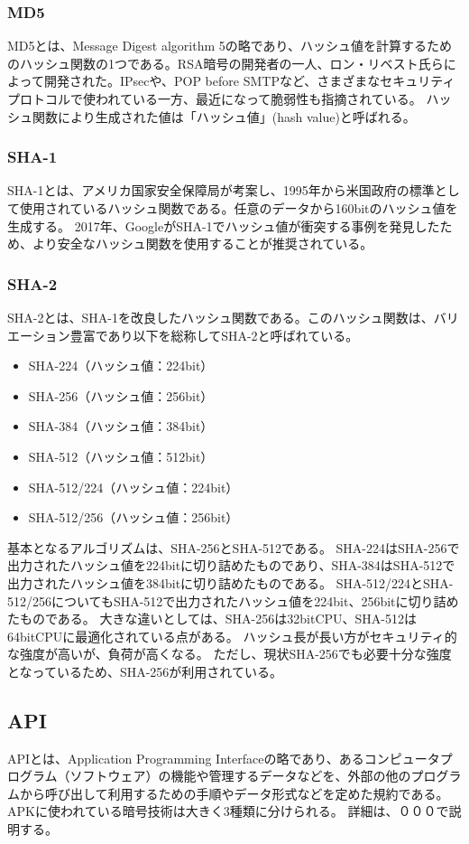 \subsubsection {MD5}
MD5とは、Message Digest algorithm 5の略であり、ハッシュ値を計算するためのハッシュ関数の1つである。RSA暗号の開発者の一人、ロン・リベスト氏らによって開発された。IPsecや、POP before SMTPなど、さまざまなセキュリティプロトコルで使われている一方、最近になって脆弱性も指摘されている。
ハッシュ関数により生成された値は「ハッシュ値」(hash value)と呼ばれる。

\subsubsection {SHA-1}
SHA-1とは、アメリカ国家安全保障局が考案し、1995年から米国政府の標準として使用されているハッシュ関数である。任意のデータから160bitのハッシュ値を生成する。
2017年、GoogleがSHA-1でハッシュ値が衝突する事例\cite{INTERNET Watch}を発見したため、より安全なハッシュ関数を使用することが推奨されている。

\subsubsection{SHA-2}
SHA-2とは、SHA-1を改良したハッシュ関数である。このハッシュ関数は、バリエーション豊富であり以下を総称してSHA-2と呼ばれている。
\begin{itemize}
\item SHA-224（ハッシュ値：224bit）
\item SHA-256（ハッシュ値：256bit）
\item SHA-384（ハッシュ値：384bit）
\item SHA-512（ハッシュ値：512bit）
\item SHA-512/224（ハッシュ値：224bit）
\item SHA-512/256（ハッシュ値：256bit）
\end{itemize}
基本となるアルゴリズムは、SHA-256とSHA-512である。
SHA-224はSHA-256で出力されたハッシュ値を224bitに切り詰めたものであり、SHA-384はSHA-512で出力されたハッシュ値を384bitに切り詰めたものである。
SHA-512/224とSHA-512/256についてもSHA-512で出力されたハッシュ値を224bit、256bitに切り詰めたものである。
大きな違いとしては、SHA-256は32bitCPU、SHA-512は64bitCPUに最適化されている点がある。
ハッシュ長が長い方がセキュリティ的な強度が高いが、負荷が高くなる。
ただし、現状SHA-256でも必要十分な強度となっているため、SHA-256が利用されている。


\subsection{API}
APIとは、Application Programming Interfaceの略であり、あるコンピュータプログラム（ソフトウェア）の機能や管理するデータなどを、外部の他のプログラムから呼び出して利用するための手順やデータ形式などを定めた規約である。
APKに使われている暗号技術は大きく3種類に分けられる。
詳細は、０００で説明する。


